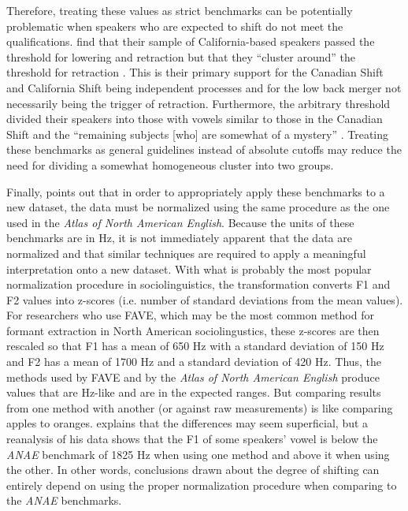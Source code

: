 Therefore, treating these values as strict benchmarks can be potentially problematic when speakers who are expected to shift do not meet the qualifications. \citeauthor{kennedy_grama_2012} find that their sample of California-based speakers passed the threshold for \dress lowering and \trap retraction but that they ``cluster around'' the threshold for \lot retraction \citeyearpar[49]{kennedy_grama_2012}. This is their primary support for the Canadian Shift and California Shift being independent processes and for the low back merger not necessarily being the trigger of \trap retraction. Furthermore, the arbitrary threshold divided their speakers into those with vowels similar to those in the Canadian Shift and the ``remaining subjects [who] are somewhat of a mystery'' \citeyearpar[51]{kennedy_grama_2012}. Treating these benchmarks as general guidelines instead of absolute cutoffs may reduce the need for dividing a somewhat homogeneous cluster into two groups.

Finally, \citet{dinkin_2018} points out that in order to appropriately apply these benchmarks to a new dataset, the data must be normalized using the same procedure as the one used in the \textit{Atlas of North American English}. Because the units of these benchmarks are in Hz, it is not immediately apparent that the data are normalized and that similar techniques are required to apply a meaningful interpretation onto a new dataset. With what is probably the most popular normalization procedure in sociolinguistics, the \citet{lobanov_1971} transformation converts F1 and F2 values into z-scores (i.e. number of standard deviations from the mean values). For researchers who use FAVE, which may be the most common method for formant extraction in North American sociolingustics, these z-scores are then rescaled so that F1 has a mean of 650 Hz with a standard deviation of 150 Hz and F2 has a mean of 1700 Hz and a standard deviation of 420 Hz. Thus, the methods used by FAVE and by the \textit{Atlas of North American English} produce values that are Hz-like and are in the expected ranges. But comparing results from one method with another (or against raw measurements) is like comparing apples to oranges. \citet{dinkin_2018} explains that the differences may seem superficial, but a reanalysis of his data shows that the F1 of some speakers’ \trap vowel is below the \textit{ANAE} benchmark of 1825 Hz when using one method and above it when using the other. In other words, conclusions drawn about the degree of shifting can entirely depend on using the proper normalization procedure when comparing to the \textit{ANAE} benchmarks.

